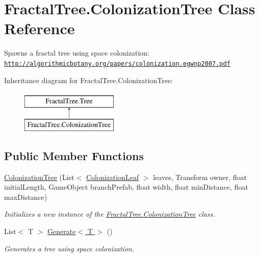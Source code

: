 \hypertarget{class_fractal_tree_1_1_colonization_tree}{}\section{Fractal\+Tree.\+Colonization\+Tree Class Reference}
\label{class_fractal_tree_1_1_colonization_tree}


Spawns a fractal tree using space colonization\+: \href{http://algorithmicbotany.org/papers/colonization.egwnp2007.pdf}{\tt http\+://algorithmicbotany.\+org/papers/colonization.\+egwnp2007.\+pdf}  


Inheritance diagram for Fractal\+Tree.\+Colonization\+Tree\+:\begin{figure}[H]
\begin{center}
\leavevmode
\includegraphics[height=2.000000cm]{class_fractal_tree_1_1_colonization_tree}
\end{center}
\end{figure}
\subsection*{Public Member Functions}
\begin{DoxyCompactItemize}
\item 
\hyperlink{class_fractal_tree_1_1_colonization_tree_acba99f382cef3e5184f0558dd5a089ea}{Colonization\+Tree} (List$<$ \hyperlink{class_fractal_tree_1_1_colonization_leaf}{Colonization\+Leaf} $>$ leaves, Transform owner, float initial\+Length, Game\+Object branch\+Prefab, float width, float min\+Distance, float max\+Distance)
\begin{DoxyCompactList}\small\item\em Initializes a new instance of the \hyperlink{class_fractal_tree_1_1_colonization_tree}{Fractal\+Tree.\+Colonization\+Tree} class. \end{DoxyCompactList}\item 
List$<$ T $>$ \hyperlink{class_fractal_tree_1_1_colonization_tree_ac16d379a8d3c2f2a56ef5e3f1c66df36}{Generate$<$ T $>$} ()
\begin{DoxyCompactList}\small\item\em Generates a tree using space colonization. \end{DoxyCompactList}\end{DoxyCompactItemize}


